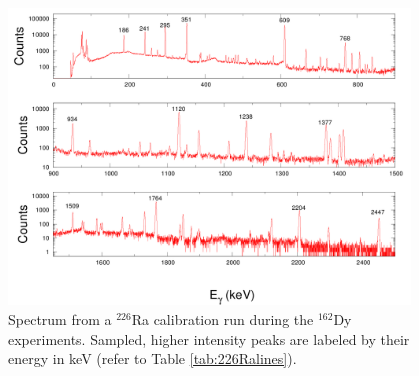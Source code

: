 \begin{figure}[ht]
\begin{center}
\includegraphics[width=0.95\textwidth]{calibration_226Ra.png}
\end{center}
\caption{Spectrum from a $^{226}$Ra calibration run during the $^{162}$Dy experiments. Sampled, higher intensity peaks are labeled by their energy in keV (refer to Table \ref{tab:226Ralines}).\label{fig:226Ra_spectrum}}
\end{figure}

